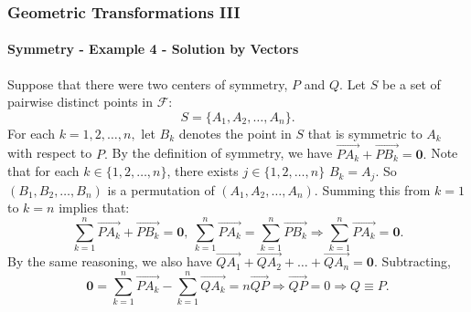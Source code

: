\documentclass[8pt,xcolor=table,dvipsnames]{beamer}
\begin{document}
\begin{frame}[t]
    \frametitle{Geometric Transformations III}
    \framesubtitle{Symmetry - Example 4 - Solution by Vectors}
    Suppose that there were two centers of symmetry, $P$ and $Q.$ Let $S$ be a set of pairwise distinct points in $\mathcal{F}$:
    \[ S = \{A_1,A_2, \ldots, A_n\}. \]
    \bigbreak
    For each $k = 1,2, \ldots, n,$ let $B_k$ denotes the point in $S$ that is symmetric to $A_k$ with respect to $P.$
    \bigbreak
    By the definition of symmetry, we have $\overrightarrow{PA_k} + \overrightarrow{PB_k} = \textbf{0}.$
    \bigbreak
    Note that for each $k \in \{1,2, \ldots, n\}$, there exists $j\in \{1,2, \ldots, n\}$ $B_k = A_j.$
    So $(B_1, B_2,\ldots, B_n)$ is a permutation of $(A_1, A_2,\ldots, A_n).$
    \bigbreak
    Summing this from $k = 1$ to $k = n$ implies that:
    \[ 
        \sum_{k=1}^{n} \overrightarrow{PA_k} + \overrightarrow{PB_k} = \textbf{0},\ 
        \sum_{k=1}^{n} \overrightarrow{PA_k} = \sum_{k=1}^{n} \overrightarrow{PB_k}
        \Rightarrow \sum_{k=1}^{n} \overrightarrow{PA_k} = \textbf{0}.
    \]
    \onslide<5->By the same reasoning, we also have $\overrightarrow{QA_1} + \overrightarrow{QA_2} + \ldots + \overrightarrow{QA_n} = \textbf{0}.$
    Subtracting, 
    \[ 
        \textbf{0} = \sum_{k=1}^{n}  \overrightarrow{PA_k} -  \sum_{k=1}^{n} \overrightarrow{QA_k} = n\overrightarrow{QP} 
        \Rightarrow \overrightarrow{QP} = 0 \Rightarrow \boxed{Q \equiv P.}
    \]
\end{frame}
\end{document}
